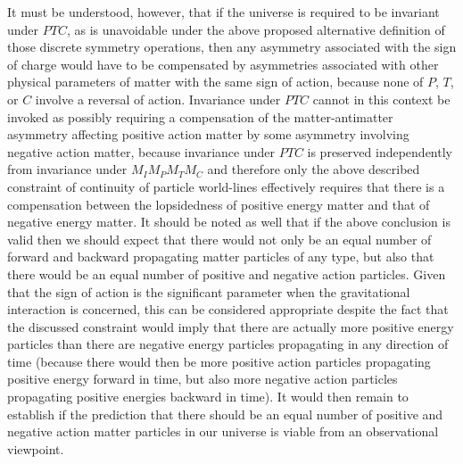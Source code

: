 \documentclass[notitlepage,12pt]{report}
\begin{document}
It must be understood, however, that if the universe is required to be invariant under $PTC$, as is unavoidable under the above proposed alternative definition of those discrete symmetry operations, then any asymmetry associated with the sign of charge would have to be compensated by asymmetries associated with other physical parameters of matter with the same sign of action, because none of $P$, $T$, or $C$ involve a reversal of action. Invariance under $PTC$ cannot in this context be invoked as possibly requiring a compensation of the matter-antimatter asymmetry affecting positive action matter by some asymmetry involving negative action matter, because invariance under $PTC$ is preserved independently from invariance under $M_{I}M_{P}M_{T}M_{C}$ and therefore only the above described constraint of continuity of particle world-lines effectively requires that there is a compensation between the lopsidedness of positive energy matter and that of negative energy matter. It should be noted as well that if the above conclusion is valid then we should expect that there would not only be an equal number of forward and backward propagating matter particles of any type, but also that there would be an equal number of positive and negative action particles. Given that the sign of action is the significant parameter when the gravitational interaction is concerned, this can be considered appropriate despite the fact that the discussed constraint would imply that there are actually more positive energy particles than there are negative energy particles propagating in any direction of time (because there would then be more positive action particles propagating positive energy forward in time, but also more negative action particles propagating positive energies backward in time). It would then remain to establish if the prediction that there should be an equal number of positive and negative action matter particles in our universe is viable from an observational viewpoint.
\end{document}
